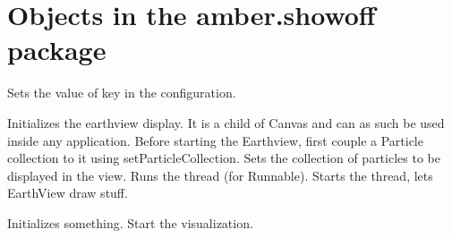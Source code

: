 \section{Objects in the amber.showoff package}


\begin{classmetadata}
\end{classmetadata}

\begin{interface}
    {Sets the value of key in the configuration.}
\end{interface}




\begin{classmetadata}
\end{classmetadata}

\begin{interface}
    {Initializes the earthview display. It is a child of Canvas and can as such
    be used inside any application. Before starting the Earthview, first couple
    a Particle collection to it using setParticleCollection.}
    {Sets the collection of particles to be displayed in the view.}
    {Runs the thread (for Runnable).}
    {Starts the thread, lets EarthView draw stuff.}
\end{interface}




\begin{classmetadata}
\end{classmetadata}

\begin{interface}
    {Initializes something.}
    {Start the visualization.}
\end{interface}




\begin{classmetadata}
\end{classmetadata}

